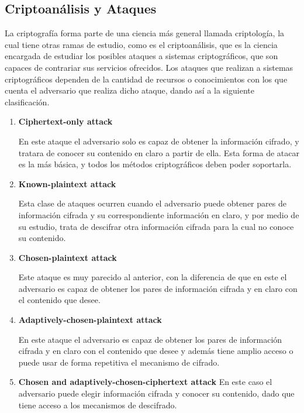   \subsection{Criptoanálisis y Ataques}

    La criptografía forma parte de una ciencia más general llamada
    criptología, la cual tiene otras ramas de estudio, como es el
    criptoanálisis, que es la ciencia encargada de estudiar los posibles
    ataques a sistemas criptográficos, que son capaces de contrariar sus
    servicios ofrecidos.
    Los ataques que realizan a sistemas criptográficos dependen de la cantidad
    de recursos o conocimientos con los que cuenta el adversario que realiza
    dicho ataque, dando así a la siguiente clasificación.

    \begin{enumerate}

      \item \textbf{Ciphertext-only attack}

        En este ataque el adversario solo es capaz de obtener la información
        cifrado, y tratara de conocer su contenido en claro a partir de ella.
        Esta forma de atacar es la más básica, y todos los métodos
        criptográficos deben poder soportarla.

      \item \textbf{Known-plaintext attack}

        Esta clase de ataques ocurren cuando el adversario puede obtener pares
        de información cifrada y su correspondiente información en claro, y
        por medio de su estudio, trata de descifrar otra información cifrada
        para la cual no conoce su contenido.

      \item \textbf{Chosen-plaintext attack}

        Este ataque es muy parecido al anterior, con la diferencia de que en
        este el adversario es capaz de obtener los pares de información
        cifrada y en claro con el contenido que desee.

      \item \textbf{Adaptively-chosen-plaintext attack}

        En este ataque el adversario es capaz de obtener los pares de
        información cifrada y en claro con el contenido que desee y además 
        tiene amplio acceso o puede usar de forma repetitiva el mecanismo de
        cifrado.

      \item \textbf{Chosen and adaptively-chosen-ciphertext attack}
        En este caso el adversario puede elegir información cifrada y conocer
        su contenido, dado que tiene acceso a los mecanismos de descifrado.

    \end{enumerate}

